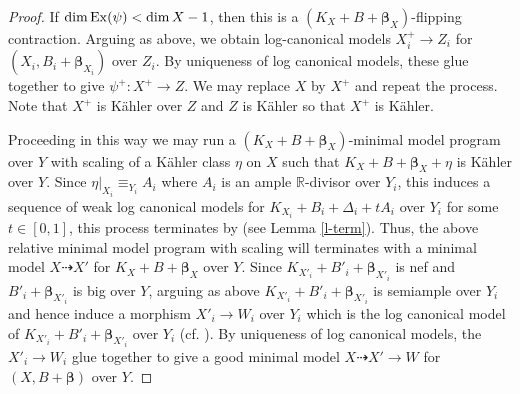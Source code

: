 \documentclass[11pt]{amsart}
\numberwithin{equation}{section}
\def\bbeta{\boldsymbol{\beta}}
\def\dim{\operatorname{dim}}
\newcommand\R{{\mathbb{R}}}
\theoremstyle{definition}
\theoremstyle{definition}
\theoremstyle{definition}
\begin{document}
\begin{proof}
If  $\dim {\rm Ex}(\psi)<\dim X-1$, then this is a { $(K_X+B+\bbeta_X)$-}flipping contraction.
Arguing as above, we obtain log-canonical models $X_i^+\to Z_i$ for $(X_i,B_i+\bbeta _{X_i})$ over $Z_i$. 
By uniqueness of log canonical models, these glue together to give $\psi ^+:X^+\to Z$.
We may replace $X$ by $X^+$ and repeat the process. Note that $X^+$ is K\"ahler over $Z$ and $Z$ is K\"ahler so that $X^+$ is K\"ahler.

Proceeding in this way we may run a { $(K_X+B+\bbeta_X)$-}minimal model program over $Y$ with scaling of a K\"ahler class $\eta$ on $X$ such that $K_X+B+\bbeta _X+\eta$ is K\"ahler over $Y$. Since 
$\eta|_{X_i}\equiv_{Y_i} A_i$ where $A_i$ is an ample $\R$-divisor over $Y_i$, this induces a sequence of weak log canonical models for $K_{X_i}+B_i+\Delta _i+tA_i$ over $Y_i$ for some $t\in [0,1]$, this process terminates by \cite[Theorem E]{Fuj22} (see Lemma \ref{l-term}).
Thus, the above relative minimal model program with scaling will terminates with a minimal model $X\dasharrow X'$ for $K_{X}+B+\bbeta _{X}$ over $Y$. Since $K_{X'_i}+B'_i+\bbeta _{X'_i}$ is nef and $B'_i+\bbeta _{X'_i}$ is big  over $Y$, arguing as above $K_{X'_i}+B'_i+\bbeta _{X'_i}$ is semiample over $Y_i$ and hence induce a morphism $X'_i\to W_i$ over $Y_i$ which is the log canonical model of $K_{X'_i}+B'_i+\bbeta _{X'_i}$ over $Y_i$ (cf. \cite{Fuj22}). 
By uniqueness of log canonical models, the $X'_i\to W_i$ glue together to give a good minimal model $X\dasharrow X'\to W$ for $({X},B+\bbeta )$ over $Y$.
\end{proof}
\end{document}
